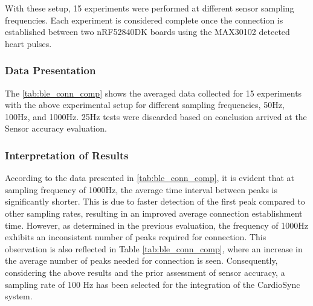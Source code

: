 \noindent With these setup, 15 experiments were performed at different sensor sampling frequencies. Each experiment is considered complete once the connection is established between two nRF52840DK boards using the MAX30102 detected heart pulses.

\subsubsection{Data Presentation}
The \autoref{tab:ble_conn_comp} shows the averaged data collected for 15 experiments with the above experimental setup for different sampling frequencies, 50Hz, 100Hz, and 1000Hz. 25Hz tests were discarded based on conclusion arrived at the Sensor accuracy evaluation.

\subsubsection{Interpretation of Results}
According to the data presented in \autoref{tab:ble_conn_comp}, it is evident that at sampling frequency of 1000Hz, the average time interval between peaks is significantly shorter. This is due to faster detection of the first peak compared to other sampling rates, resulting in an improved average connection establishment time. However, as determined in the previous evaluation, the frequency of 1000Hz exhibits an inconsistent number of peaks required for connection. This observation is also reflected in Table \ref{tab:ble_conn_comp}, where an increase in the average number of peaks needed for connection is seen. Consequently, considering the above results and the prior assessment of sensor accuracy, a sampling rate of 100 Hz has been selected for the integration of the CardioSync system. 

